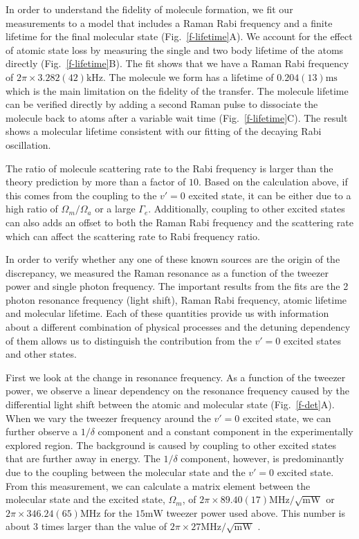 \documentclass[aps,prl,twocolumn,groupedaddress]{revtex4-1}
\newcommand{\todo}[1]{}
\begin{document}
In order to understand the fidelity of molecule formation, we fit our measurements to a model that includes a Raman Rabi frequency and a finite lifetime for the final molecular state (Fig.~\ref{f-lifetime}A). We account for the effect of atomic state loss by measuring the single and two body lifetime of the atoms directly (Fig.~\ref{f-lifetime}B). The fit shows that we have a Raman Rabi frequency of $2\pi\times3.282(42) \mathrm{kHz}$. The molecule we form has a lifetime of $0.204(13) \mathrm{ms}$ which is the main limitation on the fidelity of the transfer. The molecule lifetime can be verified directly by adding a second Raman pulse to dissociate the molecule back to atoms after a variable wait time (Fig.~\ref{f-lifetime}C). The result shows a molecular lifetime consistent with our fitting of the decaying Rabi oscillation.

The ratio of molecule scattering rate to the Rabi frequency is larger than the theory prediction
by more than a factor of $10$.
Based on the calculation above, if this comes from the coupling to the $v'=0$ excited state,
it can be either due to a high ratio of $\Omega_m / \Omega_a$ or a large $\Gamma_e$.
Additionally, coupling to other excited states can also adds an offset to both the Raman
Rabi frequency and the scattering rate which can affect the scattering rate
to Rabi frequency ratio.

In order to verify whether any one of these known sources are the origin of the discrepancy,
we measured the Raman resonance as a function of the tweezer power and single photon frequency.
The important results from the fits are the 2 photon resonance frequency (light shift),
Raman Rabi frequency, atomic lifetime and molecular lifetime.
Each of these quantities provide us with information about a different combination
of physical processes and the detuning dependency of them allows us
to distinguish the contribution from the $v'=0$ excited states and other states.

First we look at the change in resonance frequency.
As a function of the tweezer power, we observe a linear dependency on the resonance frequency
caused by the differential light shift between the atomic and molecular state (Fig.~\ref{f-det}A).
When we vary the tweezer frequency around the $v'=0$ excited state,
we can further observe a $1/\delta$ component and a constant component
in the experimentally explored region.
The background is caused by coupling to other excited states that are further away in energy.
The $1/\delta$ component, however, is predominantly due to the coupling between
the molecular state and the $v'=0$ excited state.
From this measurement, we can calculate a matrix element between the molecular state and
the excited state, $\Omega_m$, of $2\pi\times89.40(17) \mathrm{MHz}/\sqrt{\mathrm{mW}}$
or $2\pi\times346.24(65) \mathrm{MHz}$ for the $15 \mathrm{mW}$ tweezer power used above.
This number is about $3$ times larger than the value of
$2\pi\times27 \mathrm{MHz}/\sqrt{\mathrm{mW}}$ \todo{ref/sm theory}.
\todo{make sure theory part mentions $\Omega_{down}\gg\Omega_{up}$,
  also $\Omega$ vs $\Omega'$ for the single leg vs cross coupling number.}
\end{document}
